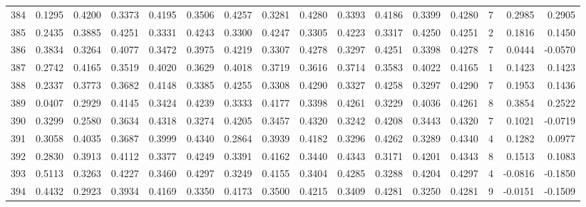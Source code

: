 \begin{tabular}{lrrrrrrrrrrrrrrr}
384 &      0.1295 &  0.4200 &  0.3373 &  0.4195 &  0.3506 &  0.4257 &  0.3281 &  0.4280 &  0.3393 &  0.4186 &   0.3399 &     0.4280 &      7 &                    0.2985 &                     0.2905 \\
385 &      0.2435 &  0.3885 &  0.4251 &  0.3331 &  0.4243 &  0.3300 &  0.4247 &  0.3305 &  0.4223 &  0.3317 &   0.4250 &     0.4251 &      2 &                    0.1816 &                     0.1450 \\
386 &      0.3834 &  0.3264 &  0.4077 &  0.3472 &  0.3975 &  0.4219 &  0.3307 &  0.4278 &  0.3297 &  0.4251 &   0.3398 &     0.4278 &      7 &                    0.0444 &                    -0.0570 \\
387 &      0.2742 &  0.4165 &  0.3519 &  0.4020 &  0.3629 &  0.4018 &  0.3719 &  0.3616 &  0.3714 &  0.3583 &   0.4022 &     0.4165 &      1 &                    0.1423 &                     0.1423 \\
388 &      0.2337 &  0.3773 &  0.3682 &  0.4148 &  0.3385 &  0.4255 &  0.3308 &  0.4290 &  0.3327 &  0.4258 &   0.3297 &     0.4290 &      7 &                    0.1953 &                     0.1436 \\
389 &      0.0407 &  0.2929 &  0.4145 &  0.3424 &  0.4239 &  0.3333 &  0.4177 &  0.3398 &  0.4261 &  0.3229 &   0.4036 &     0.4261 &      8 &                    0.3854 &                     0.2522 \\
390 &      0.3299 &  0.2580 &  0.3634 &  0.4318 &  0.3274 &  0.4205 &  0.3457 &  0.4320 &  0.3242 &  0.4208 &   0.3443 &     0.4320 &      7 &                    0.1021 &                    -0.0719 \\
391 &      0.3058 &  0.4035 &  0.3687 &  0.3999 &  0.4340 &  0.2864 &  0.3939 &  0.4182 &  0.3296 &  0.4262 &   0.3289 &     0.4340 &      4 &                    0.1282 &                     0.0977 \\
392 &      0.2830 &  0.3913 &  0.4112 &  0.3377 &  0.4249 &  0.3391 &  0.4162 &  0.3440 &  0.4343 &  0.3171 &   0.4201 &     0.4343 &      8 &                    0.1513 &                     0.1083 \\
393 &      0.5113 &  0.3263 &  0.4227 &  0.3460 &  0.4297 &  0.3249 &  0.4155 &  0.3404 &  0.4285 &  0.3288 &   0.4204 &     0.4297 &      4 &                   -0.0816 &                    -0.1850 \\
394 &      0.4432 &  0.2923 &  0.3934 &  0.4169 &  0.3350 &  0.4173 &  0.3500 &  0.4215 &  0.3409 &  0.4281 &   0.3250 &     0.4281 &      9 &                   -0.0151 &                    -0.1509 \\

\end{tabular}
